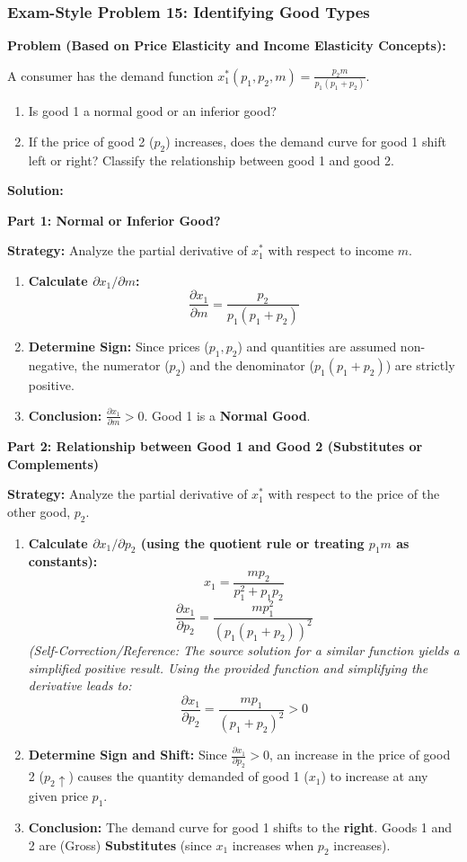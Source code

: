 \documentclass{article}
\begin{document}
\subsubsection*{Exam-Style Problem 15: Identifying Good Types}

\textbf{Problem (Based on Price Elasticity and Income Elasticity Concepts):}

A consumer has the demand function $x_1^*(p_1, p_2, m) = \frac{p_2 m}{p_1(p_1 + p_2)}$.
\begin{enumerate}
    \item Is good 1 a normal good or an inferior good?
    \item If the price of good 2 ($p_2$) increases, does the demand curve for good 1 shift left or right? Classify the relationship between good 1 and good 2.
\end{enumerate}

\textbf{Solution:}

\textbf{Part 1: Normal or Inferior Good?}

\textbf{Strategy:} Analyze the partial derivative of $x_1^*$ with respect to income $m$.
\begin{enumerate}
    \item \textbf{Calculate $\partial x_1 / \partial m$:}
    \[ \frac{\partial x_1}{\partial m} = \frac{p_2}{p_1(p_1 + p_2)} \]
    \item \textbf{Determine Sign:} Since prices ($p_1, p_2$) and quantities are assumed non-negative, the numerator ($p_2$) and the denominator ($p_1(p_1 + p_2)$) are strictly positive.
    \item \textbf{Conclusion:} $\frac{\partial x_1}{\partial m} > 0$. Good 1 is a \textbf{Normal Good}.
\end{enumerate}

\textbf{Part 2: Relationship between Good 1 and Good 2 (Substitutes or Complements)}

\textbf{Strategy:} Analyze the partial derivative of $x_1^*$ with respect to the price of the other good, $p_2$.
\begin{enumerate}
    \item \textbf{Calculate $\partial x_1 / \partial p_2$ (using the quotient rule or treating $p_1 m$ as constants):}
    \[ x_1 = \frac{m p_2}{p_1^2 + p_1 p_2} \]
    \[ \frac{\partial x_1}{\partial p_2} = \frac{m p_1^2}{(p_1(p_1 + p_2))^2} \]
    \textit{(Self-Correction/Reference: The source solution for a similar function yields a simplified positive result. Using the provided function and simplifying the derivative leads to:}
    \[ \frac{\partial x_1}{\partial p_2} = \frac{m p_1}{(p_1+p_2)^2} > 0 \]
    \item \textbf{Determine Sign and Shift:} Since $\frac{\partial x_1}{\partial p_2} > 0$, an increase in the price of good 2 ($p_2 \uparrow$) causes the quantity demanded of good 1 ($x_1$) to increase at any given price $p_1$.
    \item \textbf{Conclusion:} The demand curve for good 1 shifts to the \textbf{right}. Goods 1 and 2 are (Gross) \textbf{Substitutes} (since $x_1$ increases when $p_2$ increases).
\end{enumerate}
\end{document}
